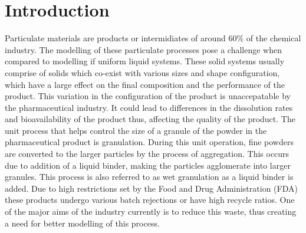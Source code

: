 \documentclass[fleqn,twoside,10pt]{article}
\begin{document}
\section{Introduction}
Particulate materials are products or intermidiates of around $60\%$ of the chemical industry\citep{ingram2005}.
The modelling of these particulate processes pose a challenge when compared to modelling if uniform liquid
systems. These solid systems usually comprise of solids which co-exist with various sizes and shape configuration,
which have a large effect on the final composition and the performance of the product. This variation in the 
configuration of the product is unaccepatable by the pharmaceutical industry. It could lead to differences in the 
dissolution rates and bioavailability of the product thus, affecting the quality of the product. The unit process 
that helps control the size of a granule of the powder in the pharmaceutical product is granulation. During this 
unit operation, fine powders are converted to the  larger particles by the process of aggregation. This occurs
due to addition of a liquid binder, making the particles agglomerate into larger granules. This process is also 
referred to as wet granulation as a liquid binder is added. Due to high restrictions set by the Food and Drug 
Administration (FDA) these products undergo various batch rejections or have high recycle ratios\citep{sen2014}. 
One of the major aims of the industry currently is to reduce this waste, thus creating a need for better 
modelling of this process.
\end{document}
